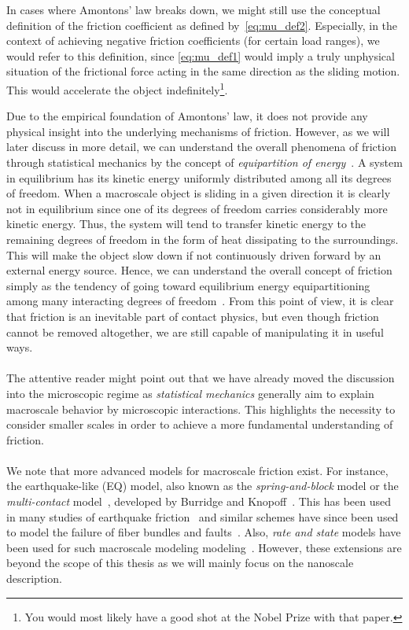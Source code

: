 In cases where Amontons' law breaks down, we might still use the conceptual
definition of the friction coefficient as defined by~\cref{eq:mu_def2}.
Especially, in the context of achieving negative friction coefficients (for certain load ranges), we would refer to this definition, since \cref{eq:mu_def1}
would imply a truly unphysical situation of the frictional force acting in the
same direction as the sliding motion. This would accelerate the object
indefinitely\footnote{You would most likely have a good shot at the Nobel Prize
with that paper.}.

Due to the empirical foundation of Amontons’ law, it does not provide any
physical insight into the underlying mechanisms of friction. However, as we will
later discuss in more detail, we can understand the overall phenomena of
friction through statistical mechanics by the concept of \textit{equipartition
of energy}~\cite{Manini_2016}. A system in equilibrium has its kinetic energy
uniformly distributed among all its degrees of freedom. When a macroscale object
is sliding in a given direction it is clearly not in equilibrium since one of
its degrees of freedom carries considerably more kinetic energy. Thus, the
system will tend to transfer kinetic energy to the remaining
degrees of freedom in the form of heat dissipating to the surroundings. This will make the object slow down if not continuously driven forward by an external energy source. Hence, we can understand the overall concept of friction simply
as the tendency of going toward equilibrium energy equipartitioning among many
interacting degrees of freedom~\cite{Manini_2016}. From this point of view, it is
clear that friction is an inevitable part of contact physics, but even though
friction cannot be removed altogether, we are still capable of manipulating it
in useful ways. \\
\\
The attentive reader might point out that we have already moved the discussion
into the microscopic regime as \textit{statistical mechanics} generally
aim to explain macroscale behavior by microscopic interactions. This 
highlights the necessity to consider smaller scales in order to achieve a more fundamental understanding of friction.
\\
\\
We note that more advanced models for macroscale friction exist. For instance, the earthquake-like (EQ) model, also known as the \textit{spring-and-block} model or the \textit{multi-contact} model~\cite{Manini_2016}, developed by Burridge and Knopoff~\cite{Burridge_1967}. This has been used in many studies of earthquake friction~\cite{PhysRevLett.88.096102} and similar schemes have since been used to model the failure of fiber bundles and faults~\cite{newman_failure_1991, Smalley_1985}. Also, \textit{rate and state} models have been used for such macroscale modeling modeling~\cite{SELVADURAI2023229689}. However, these extensions are beyond the scope of this thesis as we will mainly focus on the nanoscale description. 



